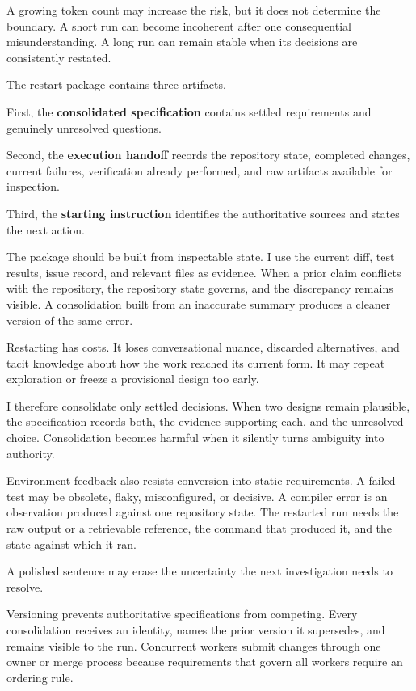 A growing token count may increase the risk, but it does not determine the boundary. A short run can become incoherent after one consequential misunderstanding. A long run can remain stable when its decisions are consistently restated.

The restart package contains three artifacts.

First, the \textbf{consolidated specification} contains settled requirements and genuinely unresolved questions.

Second, the \textbf{execution handoff} records the repository state, completed changes, current failures, verification already performed, and raw artifacts available for inspection.

Third, the \textbf{starting instruction} identifies the authoritative sources and states the next action.

The package should be built from inspectable state. I use the current diff, test results, issue record, and relevant files as evidence. When a prior claim conflicts with the repository, the repository state governs, and the discrepancy remains visible. A consolidation built from an inaccurate summary produces a cleaner version of the same error.

Restarting has costs. It loses conversational nuance, discarded alternatives, and tacit knowledge about how the work reached its current form. It may repeat exploration or freeze a provisional design too early.

I therefore consolidate only settled decisions. When two designs remain plausible, the specification records both, the evidence supporting each, and the unresolved choice. Consolidation becomes harmful when it silently turns ambiguity into authority.

Environment feedback also resists conversion into static requirements. A failed test may be obsolete, flaky, misconfigured, or decisive. A compiler error is an observation produced against one repository state. The restarted run needs the raw output or a retrievable reference, the command that produced it, and the state against which it ran.

A polished sentence may erase the uncertainty the next investigation needs to resolve.

Versioning prevents authoritative specifications from competing. Every consolidation receives an identity, names the prior version it supersedes, and remains visible to the run. Concurrent workers submit changes through one owner or merge process because requirements that govern all workers require an ordering rule.

